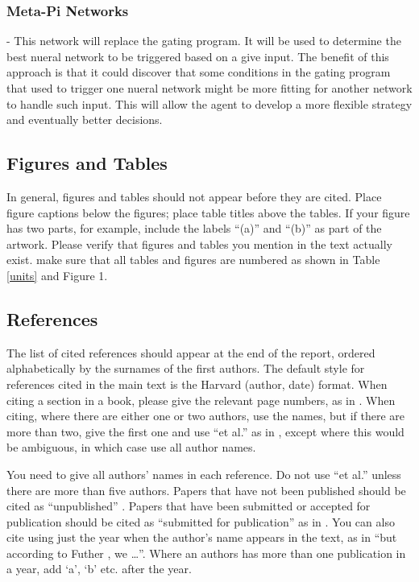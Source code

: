 \documentclass[12pt,a4paper]{article}
\begin{document}
\subsubsection{Meta-Pi Networks}
- This network will replace the gating program. It will be used to determine the best nueral network to be triggered based on a give input. The benefit of this approach is that it could discover that some conditions in the gating program that used to trigger one nueral network might be more fitting for another network to handle such input. This will allow the agent to develop a more flexible strategy and eventually better decisions. 




\subsection{Figures and Tables}
In general, figures and tables should not appear before they are cited.  Place figure captions below the figures; place table titles above the tables.  If your figure has two parts, for example, include the labels ``(a)'' and ``(b)'' as part of the artwork.  Please verify that figures and tables you mention in the text actually exist.  make sure that all tables and figures are numbered as shown in Table \ref{units} and Figure 1.

\subsection{References}

The list of cited references should appear at the end of the report, ordered alphabetically by the surnames of the first authors.  The default style for references cited in the main text is the  Harvard (author, date) format.  When citing a section in a book, please give the relevant page numbers, as in \cite[p293]{budgen}.  When citing, where there are either one or two authors, use the names, but if there are more than two, give the first one and use ``et al.'' as in  , except where this would be ambiguous, in which case use all author names.

You need to give all authors' names in each reference.  Do not use ``et al.'' unless there are more than five authors.  Papers that have not been published should be cited as ``unpublished'' \cite{euther}.  Papers that have been submitted or accepted for publication should be cited as ``submitted for publication'' as in \cite{futher} .  You can also cite using just the year when the author's name appears in the text, as in ``but according to Futher \citeyear{futher}, we \dots''.  Where an authors has more than one publication in a year, add `a', `b' etc. after the year.





\end{document}
